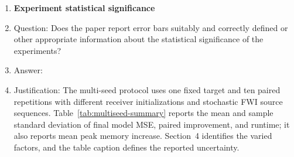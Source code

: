 \begin{enumerate}
\item {\bf Experiment statistical significance}
    \item[] Question: Does the paper report error bars suitably and correctly defined or other appropriate information about the statistical significance of the experiments?
    \item[] Answer: \answerYes{}
    \item[] Justification: The multi-seed protocol uses one fixed target and ten
    paired repetitions with different receiver initializations and stochastic
    FWI source sequences. Table~\ref{tab:multiseed-summary} reports the mean and
    sample standard deviation of final model MSE, paired improvement, and
    runtime; it also reports mean peak memory increase. Section~4 identifies the
    varied factors, and the table caption defines the reported uncertainty.


\end{enumerate}
